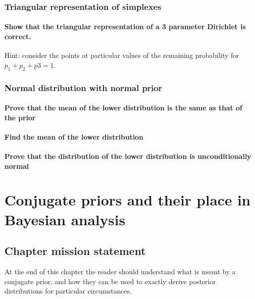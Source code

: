 \documentclass[11pt,fullpage]{book}
\begin{document}
\subsection{Triangular representation of simplexes}
\subsubsection{Show that the triangular representation of a 3 parameter Dirichlet is correct.}
Hint: consider the points at particular values of the remaining probability for $p_1+p_2+p3=1$.

\subsection{Normal distribution with normal prior}
\subsubsection{Prove that the mean of the lower distribution is the same as that of the prior}
\subsubsection{Find the mean of the lower distribution}
\subsubsection{Prove that the distribution of the lower distribution is unconditionally normal}

\chapter{Conjugate priors and their place in Bayesian analysis}\label{chap:conjugate}
\section{Chapter mission statement}
At the end of this chapter the reader should understand what is meant by a conjugate prior, and how they can be used to exactly derive posterior distributions for particular circumstances.
\end{document}
